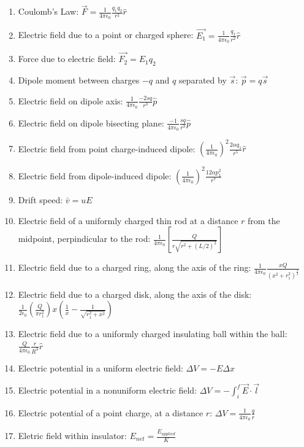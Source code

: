\documentclass[nobib]{tufte-handout}
\begin{document}
\begin{enumerate}
    \item Coulomb's Law: $\vec{F} = \frac{1}{4\pi \epsilon_0}\frac{q_1 q_2}{r^2}\hat{r}$
    \item Electric field due to a point or charged sphere: $\vec{E_1} = \frac{1}{4\pi \epsilon_0}\frac{q_1}{r^2}\hat{r}$
    \item Force due to electric field: $\vec{F_2} = E_1 q_2$
    \item Dipole moment between charges $-q$ and $q$ separated by $\vec{s}$: $\vec{p} = q\vec{s}$
    \item Electric field on dipole axis: $\frac{1}{4\pi \epsilon_0}\frac{-2sq}{r^3}\hat{p}$
    \item Electric field on dipole bisecting plane: $\frac{-1}{4 \pi \epsilon_0}\frac{sq}{r^3}\hat{p}$
    \item Electric field from point charge-induced dipole: $\left(\frac{1}{4\pi \epsilon_0}\right)^2 \frac{2 \alpha q_1}{r^5}\hat{r}$
    \item Electric field from dipole-induced dipole: $\left(\frac{1}{4\pi \epsilon_0}\right)^2 \frac{12 \alpha p_1^2}{r^7}$
    \item Drift speed: $\bar{v} = uE$
    \item Electric field of a uniformly charged thin rod at a distance $r$ from the midpoint,
    perpindicular to the rod: $\frac{1}{4 \pi \epsilon_0}\left[\frac{Q}{r\sqrt{r^2+(L/2)^2}}\right]$
    \item Electric field due to a charged ring, along the axis of the ring:
    $\frac{1}{4 \pi \epsilon_0}\frac{xQ}{\left(x^{2}+r_{1}^{2}\right)^{\frac{3}{2}}}$
    \item Electric field due to a charged disk, along the axis of the disk:
    $\frac{1}{2 \epsilon_0}\left(\frac{Q}{\pi r_{1}^{2}}\right)x\left(\frac{1}{x}-\frac{1}{\sqrt{r_{1}^{2}+x^{2}}}\right)$
    \item Electric field due to a uniformly charged insulating ball within the ball: 
    $\frac{Q}{4\pi \epsilon_0}\frac{r}{R^3}\hat{r}$
    \item Electric potential in a uniform electric field: $\Delta V = -E\Delta x$
    \item Electric potential in a nonuniform electric field: $\Delta V = -\int_{i}^{f} \vec{E} \cdot \vec{l}$
    \item Electric potential of a point charge, at a distance $r$: $\Delta V = \frac{1}{4\pi \epsilon_0}\frac{q}{r}$
    \item Eletric field within insulator: $E_{net} = \frac{E_{applied}}{K}$

\end{enumerate}
\end{document}
